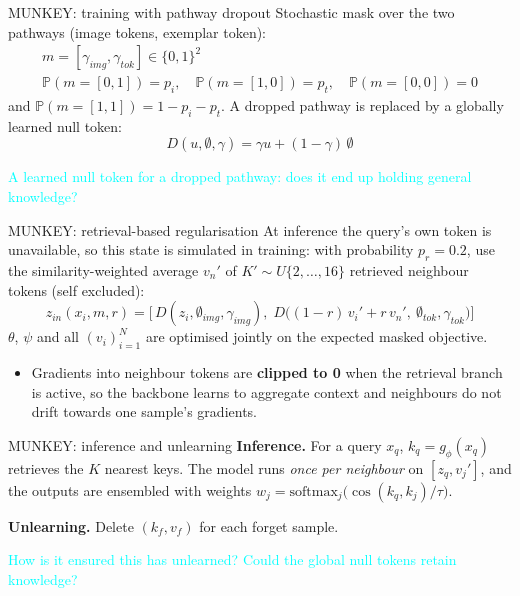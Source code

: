 \documentclass{beamer}
\newcommand{\pierre}[1]{\textcolor{cyan}{#1}}
\begin{document}
\begin{frame}{MUNKEY: training with pathway dropout}
Stochastic mask over the two pathways (image tokens, exemplar token):
\begin{gather*}
  m = [\gamma_{img}, \gamma_{tok}] \in \{0,1\}^2 \\
  \mathbb{P}(m{=}[0,1]) = p_i,\quad
  \mathbb{P}(m{=}[1,0]) = p_t,\quad
  \mathbb{P}(m{=}[0,0]) = 0
\end{gather*}
and $\mathbb{P}(m{=}[1,1]) = 1 - p_i - p_t$. A dropped pathway is replaced by a
globally learned null token:
\[
  D(u, \emptyset, \gamma) = \gamma u + (1-\gamma)\,\emptyset
\]

\medskip
\pierre{A learned null token for a dropped pathway: does it end up holding
general knowledge?}
\end{frame}

\begin{frame}{MUNKEY: retrieval-based regularisation}
At inference the query's own token is unavailable, so this state is simulated in
training: with probability $p_r = 0.2$, use the similarity-weighted average
$v_n'$ of $K' \sim U\{2,\ldots,16\}$ retrieved neighbour tokens (self excluded):
\[
  z_{in}(x_i, m, r) = \big[\,D(z_i, \emptyset_{img}, \gamma_{img}),\;
  D\big((1-r)\,v_i' + r\,v_n',\ \emptyset_{tok}, \gamma_{tok}\big)\big]
\]
$\theta$, $\psi$ and all $(v_i)_{i=1}^N$ are optimised jointly on the expected
masked objective.

\medskip
\begin{itemize}
  \item Gradients into neighbour tokens are \textbf{clipped to 0} when the
        retrieval branch is active, so the backbone learns to aggregate context
        and neighbours do not drift towards one sample's gradients.
\end{itemize}
\end{frame}

\begin{frame}{MUNKEY: inference and unlearning}
\textbf{Inference.} For a query $x_q$, $k_q = g_\phi(x_q)$ retrieves the $K$
nearest keys. The model runs \emph{once per neighbour} on $[z_q, v_j']$, and the
outputs are ensembled with weights
$w_j = \text{softmax}_j\big(\cos(k_q, k_j)/\tau\big)$.

\medskip
\textbf{Unlearning.} Delete $(k_f, v_f)$ for each forget sample.

\medskip
\pierre{How is it ensured this has unlearned? Could the global null tokens
retain knowledge?}
\end{frame}
\end{document}
